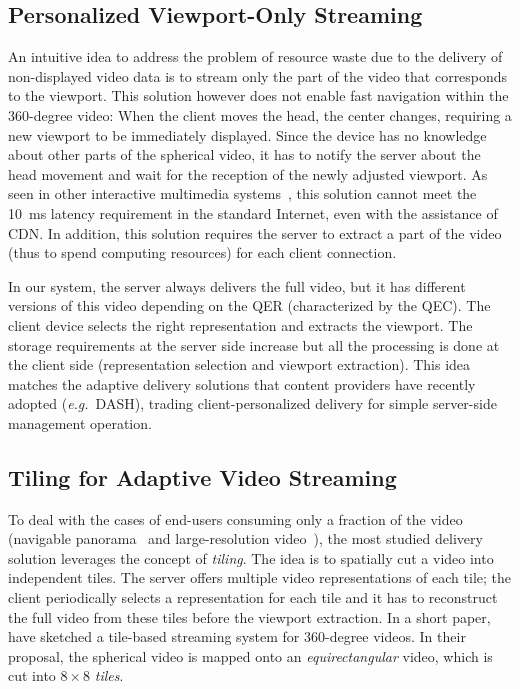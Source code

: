 \subsection{Personalized Viewport-Only Streaming}

An intuitive idea to address the problem of resource waste due to the
delivery of non-displayed video data is to stream only the part of the video that
corresponds to the viewport. This solution however does not enable
fast navigation within the $360$-degree video: When the client moves the
head, the \FoV{} center changes, requiring a new viewport to be
immediately displayed. Since the device has no knowledge about other
parts of the spherical video, it has to notify the server about the
head movement and wait for the reception of the newly adjusted viewport.
As seen in other interactive multimedia
systems~\cite{ChoyWSR14}, this solution cannot meet the \SI{10}{ms} latency
requirement in the standard Internet, even with the assistance of
\ac{CDN}. In addition, this solution requires the server to extract a
part of the video (thus to spend computing resources) for each client
connection.

In our system, the server always delivers
the full video, but it has different versions of this video depending
on the \ac{QER} (characterized by the \ac{QEC}). The client device
selects the right representation and extracts the viewport. The
storage requirements at the server side increase but all the
processing is done at the client side (representation selection and
viewport extraction). This idea matches the adaptive delivery
solutions that content providers have recently adopted %
(\textit{e.g.}~\ac{DASH}), trading client-personalized delivery for
simple server-side management operation.

\subsection{Tiling for Adaptive Video Streaming}
To deal with the cases of end-users consuming only a fraction of the
video (navigable
panorama~\cite{sanchez_compressed_2015,wang_mixing_2014,gaddam_tiling_2015}
and large-resolution video~\cite{jean16mmsys}), the most studied delivery solution
leverages the concept
of \emph{tiling}.
The idea is to
spatially cut a video into independent tiles. The server offers
multiple video representations of each tile; the client periodically
selects a representation for each tile and it has to reconstruct the
full video from these tiles before the viewport extraction.
In a short paper,~\citet{ochi_live_2015} have sketched a
tile-based streaming system for $360$-degree videos. In their proposal,
the spherical video is mapped onto an \emph{equirectangular} video,
which is cut into $8\!\times\! 8$ \emph{tiles}.

